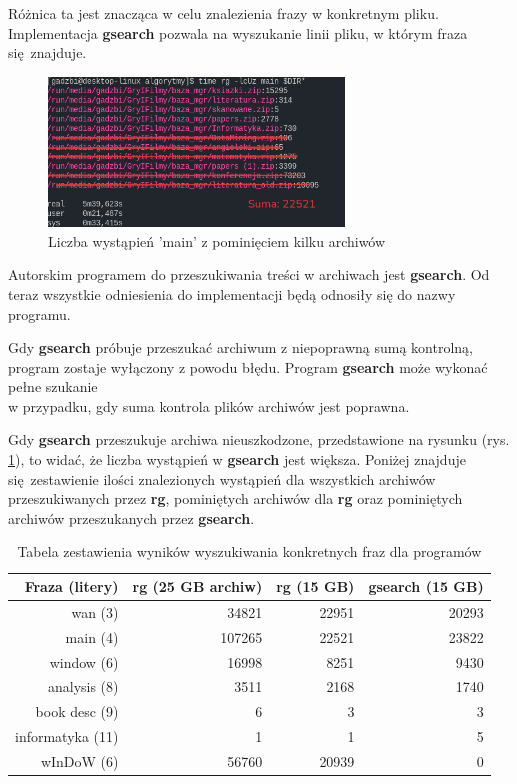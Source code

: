Różnica ta jest znacząca w celu znalezienia frazy w konkretnym pliku. 
Implementacja \textbf{gsearch} pozwala na wyszukanie linii pliku, w którym fraza się znajduje. 

\begin{figure}[htbp]
\centering
\includegraphics[width=0.7\textwidth]{./images/rgSkippedmain.png}
\caption{Liczba wystąpień 'main' z pominięciem kilku archiwów}
\label{fig:ripgrepRemoveSkipped}
\end{figure}

Autorskim programem do przeszukiwania treści w archiwach jest \textbf{gsearch}. Od teraz
wszystkie odniesienia do implementacji będą odnosiły się do nazwy programu.

Gdy \textbf{gsearch} próbuje przeszukać archiwum z niepoprawną sumą kontrolną, program
zostaje wyłączony z powodu błędu. Program \textbf{gsearch} może wykonać pełne szukanie \\ w przypadku,
gdy suma kontrola plików archiwów jest poprawna.

Gdy \textbf{gsearch} przeszukuje archiwa nieuszkodzone, przedstawione na rysunku (rys. \ref{fig:ripgrepRemoveSkipped}),
to widać, że liczba wystąpień w \textbf{gsearch} jest większa. Poniżej znajduje się zestawienie
ilości znalezionych wystąpień dla wszystkich archiwów przeszukiwanych przez \textbf{rg},
pominiętych archiwów dla \textbf{rg} oraz pominiętych archiwów przeszukanych przez \textbf{gsearch}.

\begin{table}[htbp]
    \centering
    \begin{tabular}{|r|r|r|r|}
        \hline
        \textbf{Fraza (litery)} & \textbf{rg (25 GB archiw)} & \textbf{rg (15 GB)} &  \textbf{gsearch (15 GB)} \\
        \hline
        wan (3) & 34821 & 22951 & 20293 \\
        \hline
        main (4) & 107265 & 22521 & 23822 \\
        \hline
        window (6) & 16998 & 8251 & 9430 \\
        \hline
        analysis (8) & 3511 & 2168 & 1740 \\
        \hline
        book desc (9) & 6 & 3 & 3 \\
        \hline
        informatyka (11) & 1 & 1 & 5 \\
        \hline
        wInDoW (6) & 56760 & 20939 & 0 \\
        \hline
    \end{tabular}
    \caption{Tabela zestawienia wyników wyszukiwania konkretnych fraz dla programów}
    \label{tabela:iloscWyszukanDziekiProgramom}
\end{table}

